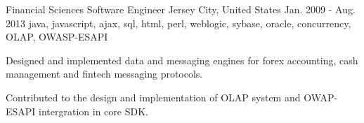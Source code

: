 \cventry
    {Financial Sciences} %
    {Software Engineer} %
    {Jersey City, United States} %
    {Jan. 2009 - Aug. 2013} %
    {java, javascript, ajax, sql, html, perl, weblogic, sybase, oracle, concurrency, OLAP, OWASP-ESAPI} %
    {
    \begin{cvitems} %
        \item { Designed and implemented data and messaging engines for forex accounting, cash management and fintech messaging protocols.}
        \item { Contributed to the design and implementation of OLAP system and OWAP-ESAPI intergration in core SDK. }
    \end{cvitems}
    }
    